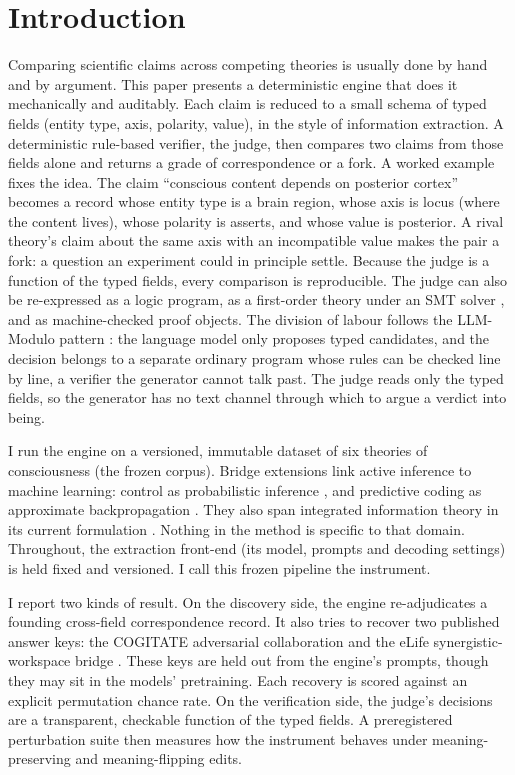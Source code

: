 \documentclass[11pt]{article}
\begin{document}
\section{Introduction}
Comparing scientific claims across competing theories is usually done by hand and by argument. This paper
presents a deterministic engine that does it mechanically and auditably. Each claim is reduced to a small
schema of typed fields (entity type, axis, polarity, value), in the style of information extraction. A
deterministic rule-based verifier, the judge, then compares two claims from those fields alone and returns
a grade of correspondence or a fork. A worked example fixes the idea. The claim ``conscious content depends
on posterior cortex'' becomes a record whose entity type is a brain region, whose axis is locus (where the
content lives), whose polarity is asserts, and whose value is posterior. A rival theory's claim about the
same axis with an incompatible value makes the pair a fork: a question an experiment could in principle
settle. Because the judge is a function of the typed fields, every comparison
is reproducible. The judge can also be re-expressed as a logic program, as a first-order theory under an
SMT solver \cite{z3}, and as machine-checked proof objects. The division of labour follows the LLM-Modulo
pattern \cite{kambhampati2024}: the language model only proposes typed candidates, and the decision belongs
to a separate ordinary program whose rules can be checked line by line, a verifier the generator cannot
talk past. The judge reads only the typed fields, so the
generator has no text channel through which to argue a verdict into being.

I run the engine on a versioned, immutable dataset of six theories of consciousness (the frozen corpus).
Bridge extensions link active inference \cite{buckley2017} to machine learning: control as probabilistic
inference \cite{levine2018}, and predictive coding as approximate backpropagation \cite{millidge2022}. They
also span integrated information theory in its current formulation \cite{albantakis2023}. Nothing in the
method is specific to that domain. Throughout, the extraction front-end (its model, prompts and decoding
settings) is held fixed and versioned. I call this frozen pipeline the instrument.

I report two kinds of result. On the discovery side, the engine re-adjudicates a founding cross-field
correspondence record. It also tries to recover two published answer keys: the COGITATE adversarial
collaboration \cite{cogitate2025} and the eLife synergistic-workspace bridge \cite{luppi2024}. These keys
are held out from the engine's prompts, though they may sit in the models' pretraining. Each recovery is
scored against an explicit permutation chance rate. On the verification side, the judge's decisions are a
transparent, checkable function of the typed fields. A preregistered perturbation suite then measures how
the instrument behaves under meaning-preserving and meaning-flipping edits.
\end{document}
